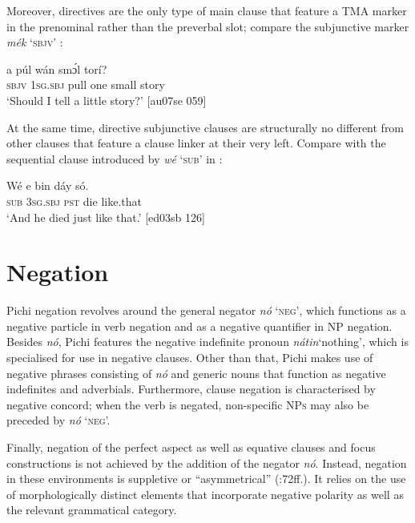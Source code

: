 Moreover, directives are the only type of main clause that feature a TMA marker in the prenominal rather than the preverbal slot; compare the subjunctive marker \textit{mék} ‘\textsc{sbjv}’ :


\ea%
    \label{ex:key:530}
    \gll {}   a    púl    wán    smɔ́l  torí?\\
\textsc{sbjv}    \textsc{1sg.sbj}  pull    one    small  story\\

\glt ‘Should I tell a little story?’ [au07se 059]
\z

At the same time, directive subjunctive clauses are structurally no different from other clauses that feature a clause linker at their very left. Compare  with the sequential clause introduced by \textit{wé} ‘\textsc{sub}’ in :


\ea%
    \label{ex:key:531}
    \gll Wé  e    bin  dáy  só.\\
\textsc{sub}  \textsc{3sg.sbj}  \textsc{pst}  die  like.that\\

\glt ‘And he died just like that.’ [ed03sb 126]
\z

\section{Negation}\label{sec:7.2}

Pichi negation revolves around the general negator \textit{nó} \textsc{‘neg’,} which functions as a negative particle in verb negation and as a negative quantifier in \textsc{NP} negation. Besides \textit{nó}, Pichi features the negative indefinite pronoun \textit{nátin}‘nothing’, which is specialised for use in negative clauses. Other than that, Pichi makes use of negative phrases consisting of \textit{nó} and generic nouns that function as negative indefinites and adverbials. Furthermore, clause negation is characterised by negative concord; when the verb is negated, non-specific \textsc{NPs} may also be preceded by \textit{nó} ‘\textsc{neg}’.


Finally, negation of the perfect aspect as well as equative clauses and focus constructions is not achieved by the addition of the negator \textit{nó}. Instead, negation in these environments is suppletive or “asymmetrical” (\citealt{Miestamo2005}:72ff.). It relies on the use of morphologically distinct elements that incorporate negative polarity as well as the relevant grammatical category.


